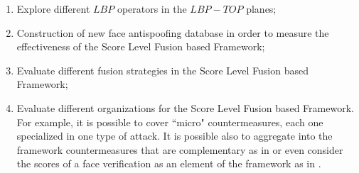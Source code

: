 \begin{enumerate}
	\item Explore different $LBP$ operators in the $LBP-TOP$ planes;
	\item Construction of new face antispoofing database in order to measure the effectiveness of the Score Level Fusion based Framework;
	\item Evaluate different fusion strategies in the Score Level Fusion based Framework;
	\item Evaluate different organizations for the Score Level Fusion based Framework. For example, it is possible to cover ``micro" countermeasures, each one specialized in one type of attack. It is possible also to aggregate into the framework countermeasures that are complementary as in \citep{Komulainen_ICB_2013} or even consider the scores of a face verification as an element of the framework as in \citep{Chingovska_CVPRWORKSHOPONBIOMETRICS_2013}.

\end{enumerate}
